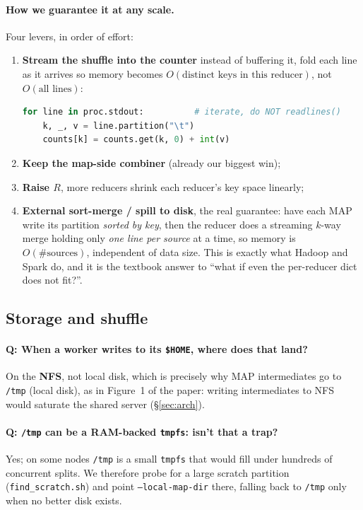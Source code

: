 \documentclass[11pt,a4paper]{article}
\newcommand{\code}[1]{\texttt{\small #1}}
\begin{document}
\paragraph{How we guarantee it at any scale.} Four levers, in order of effort:
\begin{enumerate}[leftmargin=1.6em]
  \item \textbf{Stream the shuffle into the counter} instead of buffering it,
  fold each line as it arrives so memory becomes $O(\text{distinct keys in this
  reducer})$, not $O(\text{all lines})$:
\begin{lstlisting}[language=python]
for line in proc.stdout:          # iterate, do NOT readlines()
    k, _, v = line.partition("\t")
    counts[k] = counts.get(k, 0) + int(v)
\end{lstlisting}
  \item \textbf{Keep the map-side combiner} (already our biggest win);
  \item \textbf{Raise $R$}, more reducers shrink each reducer's key space
  linearly;
  \item \textbf{External sort-merge / spill to disk}, the real guarantee: have
  each MAP write its partition \emph{sorted by key}, then the reducer does a
  streaming $k$-way merge holding only \emph{one line per source} at a time, so
  memory is $O(\#\text{sources})$, independent of data size. This is exactly what
  Hadoop and Spark do, and it is the textbook answer to ``what if even the
  per-reducer dict does not fit?''.
\end{enumerate}

\subsection{Storage and shuffle}

\paragraph{Q: When a worker writes to its \code{\$HOME}, where does that land?}
On the \textbf{NFS}, not local disk, which is precisely why MAP intermediates go
to \code{/tmp} (local disk), as in Figure~1 of the paper: writing intermediates
to NFS would saturate the shared server (\S\ref{sec:arch}).

\paragraph{Q: \code{/tmp} can be a RAM-backed \code{tmpfs}: isn't that a trap?}
Yes; on some nodes \code{/tmp} is a small \code{tmpfs} that would fill under
hundreds of concurrent splits. We therefore probe for a large scratch partition
(\code{find\_scratch.sh}) and point \code{--local-map-dir} there, falling back to
\code{/tmp} only when no better disk exists.
\end{document}
